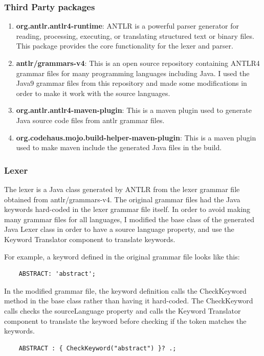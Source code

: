 \subsubsection{Third Party packages}
\begin{enumerate}
    \item \textbf{org.antlr.antlr4-runtime}: \ac{ANTLR} \cite{antlr} is a powerful parser generator for reading, processing, executing, or translating structured text or binary files. This package provides the core functionality for the lexer and parser.
    \item \textbf{antlr/grammars-v4}: This is an open source repository containing ANTLR4 grammar files for many programming languages including Java. I used the Java9 grammar files from this repository and made some modifications in order to make it work with the source languages. 
    \item \textbf{org.antlr.antlr4-maven-plugin}: This is a maven plugin used to generate Java source code files from antlr grammar files.
    \item \textbf{org.codehaus.mojo.build-helper-maven-plugin}: This is a maven plugin used to make maven include the generated Java files in the build. 
\end{enumerate}
\subsubsection{Lexer}
The lexer is a Java class generated by ANTLR from the lexer grammar file obtained from antlr/grammars-v4. The original grammar files had the Java keywords hard-coded in the lexer grammar file itself. In order to avoid making many grammar files for all languages, I modified the base class of the generated Java Lexer class in order to have a source language property, and use the Keyword Translator component to translate keywords.

For example, a keyword defined in the original grammar file looks like this:
\begin{lstlisting}
    ABSTRACT: 'abstract';
\end{lstlisting}

In the modified grammar file, the keyword definition calls the CheckKeyword method in the base class rather than having it hard-coded. The CheckKeyword calls checks the sourceLanguage property and calls the Keyword Translator component to translate the keyword before checking if the token matches the keywords.
\begin{lstlisting}
    ABSTRACT : { CheckKeyword("abstract") }? .;
\end{lstlisting}

